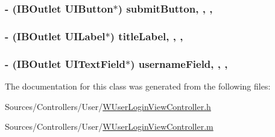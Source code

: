 \hypertarget{interface_w_user_login_view_controller_a2a7c3d4b33a80b0297668180f3a70716}{
\subsubsection[{submit\-Button}]{\setlength{\rightskip}{0pt plus 5cm}-\/ (I\-B\-Outlet U\-I\-Button$\ast$) submit\-Button\hspace{0.3cm}{\ttfamily [read]}, {\ttfamily [write]}, {\ttfamily [nonatomic]}, {\ttfamily [retain]}}}\label{interface_w_user_login_view_controller_a2a7c3d4b33a80b0297668180f3a70716}
\hypertarget{interface_w_user_login_view_controller_ae075cae889f9b93f4e2d4d34404c7a42}{
\subsubsection[{title\-Label}]{\setlength{\rightskip}{0pt plus 5cm}-\/ (I\-B\-Outlet U\-I\-Label$\ast$) title\-Label\hspace{0.3cm}{\ttfamily [read]}, {\ttfamily [write]}, {\ttfamily [nonatomic]}, {\ttfamily [retain]}}}\label{interface_w_user_login_view_controller_ae075cae889f9b93f4e2d4d34404c7a42}
\hypertarget{interface_w_user_login_view_controller_a5131df666139de3fe9e992cc0e7270d8}{
\subsubsection[{username\-Field}]{\setlength{\rightskip}{0pt plus 5cm}-\/ (I\-B\-Outlet U\-I\-Text\-Field$\ast$) username\-Field\hspace{0.3cm}{\ttfamily [read]}, {\ttfamily [write]}, {\ttfamily [nonatomic]}, {\ttfamily [retain]}}}\label{interface_w_user_login_view_controller_a5131df666139de3fe9e992cc0e7270d8}


The documentation for this class was generated from the following files\-:\begin{DoxyCompactItemize}
\item 
Sources/\-Controllers/\-User/\hyperlink{_w_user_login_view_controller_8h}{W\-User\-Login\-View\-Controller.\-h}\item 
Sources/\-Controllers/\-User/\hyperlink{_w_user_login_view_controller_8m}{W\-User\-Login\-View\-Controller.\-m}\end{DoxyCompactItemize}
